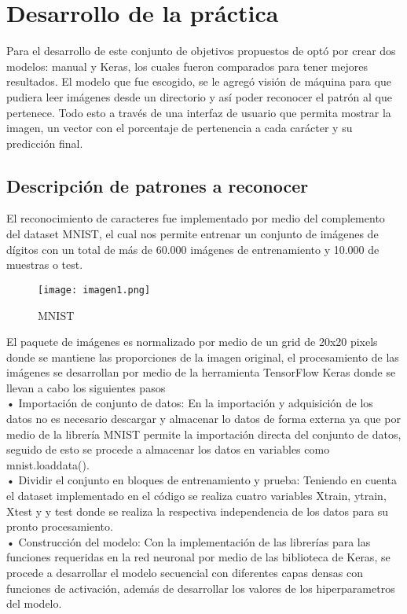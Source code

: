 \documentclass[journal]{IEEEtran}
\begin{document}
\section{Desarrollo de la práctica}
Para el desarrollo de este conjunto de objetivos propuestos de optó por crear dos modelos: manual y Keras, los cuales fueron comparados para tener mejores resultados. El modelo que fue escogido, se le agregó visión de máquina para que pudiera leer imágenes desde un directorio y así poder reconocer el patrón al que pertenece. Todo esto a través de una interfaz de usuario que permita mostrar la imagen, un vector con el porcentaje de pertenencia a cada carácter y su predicción final.

\subsection{Descripción de patrones a reconocer}
El reconocimiento de caracteres fue implementado por medio del complemento del dataset MNIST, el cual nos permite entrenar un conjunto de imágenes de dígitos con un total de más de 60.000 imágenes de entrenamiento y 10.000 de muestras o test.\\
\begin{figure} [H]
    \centering
    \texttt{[image: imagen1.png]}
    \caption{MNIST}
    \label{1}
\end{figure}
El paquete de imágenes es normalizado por medio de un grid de 20x20 pixels donde se mantiene las proporciones de la imagen original, el procesamiento de las imágenes se desarrollan por medio de la herramienta TensorFlow Keras donde se llevan a cabo los siguientes pasos\\

•	Importación de conjunto de datos:
En la importación y adquisición de los datos no es necesario descargar y almacenar lo datos de forma externa ya que por medio de la librería MNIST permite la importación directa del conjunto de datos, seguido de esto se procede a almacenar los datos en variables como mnist.loaddata().\\

•	Dividir el conjunto en bloques de entrenamiento y prueba:
Teniendo en cuenta el dataset implementado en el código se realiza cuatro variables Xtrain, ytrain, Xtest y y
test donde se realiza la respectiva independencia de los datos para su pronto procesamiento.\\

•	Construcción del modelo:
Con la implementación de las librerías para las funciones requeridas en la red neuronal por medio de las biblioteca de Keras, se procede a desarrollar el modelo secuencial con diferentes capas densas con funciones de activación, además de desarrollar los valores de los hiperparametros del modelo.\\
\end{document}
